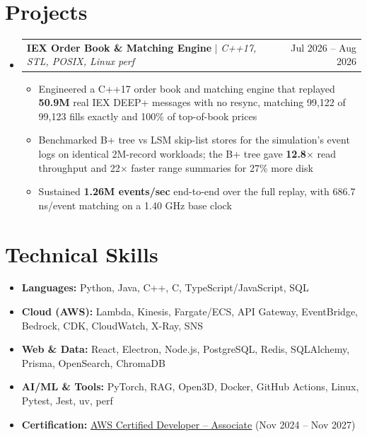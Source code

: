 \documentclass[letterpaper,10pt]{article}
\makeatletter
\newcommand{\resumeItem}[1]{\item{#1}\vspace{-1pt}}
\newcommand{\resumeProjectHeading}[2]{%
  \item
  \begin{tabular*}{\textwidth}{l@{\extracolsep{\fill}}r}
    #1 & #2 \\
  \end{tabular*}\vspace{-6pt}%
}
\newcommand{\resumeSubHeadingListStart}{\begin{itemize}[leftmargin=0in, label={}, itemsep=0pt, topsep=2pt]}
\newcommand{\resumeSubHeadingListEnd}{\end{itemize}}
\newcommand{\resumeItemListStart}{\begin{itemize}[leftmargin=0.18in, itemsep=0pt, topsep=1pt, parsep=0pt]}
\newcommand{\resumeItemListEnd}{\end{itemize}\vspace{0pt}}
\makeatother
\begin{document}
\section{Projects}
\resumeSubHeadingListStart
  \resumeProjectHeading
    {\textbf{IEX Order Book \& Matching Engine} $|$ \textit{C++17, STL, POSIX, Linux perf}}{Jul 2026 -- Aug 2026}
  \resumeItemListStart
    \resumeItem{Engineered a C++17 order book and matching engine that replayed \textbf{50.9M} real IEX DEEP+ messages with no resync, matching 99,122 of 99,123 fills exactly and 100\% of top-of-book prices}
    \resumeItem{Benchmarked B+ tree vs LSM skip-list stores for the simulation's event logs on identical 2M-record workloads; the B+ tree gave \textbf{12.8$\times$} read throughput and 22$\times$ faster range summaries for 27\% more disk}
    \resumeItem{Sustained \textbf{1.26M events/sec} end-to-end over the full replay, with 686.7 ns/event matching on a 1.40 GHz base clock}
  \resumeItemListEnd
\resumeSubHeadingListEnd

\section{Technical Skills}
\begin{itemize}[leftmargin=0in, label={}, itemsep=0pt, topsep=2pt]
  \small
  \item{\textbf{Languages:} Python, Java, C++, C, TypeScript/JavaScript, SQL}
  \item{\textbf{Cloud (AWS):} Lambda, Kinesis, Fargate/ECS, API Gateway, EventBridge, Bedrock, CDK, CloudWatch, X-Ray, SNS}
  \item{\textbf{Web \& Data:} React, Electron, Node.js, PostgreSQL, Redis, SQLAlchemy, Prisma, OpenSearch, ChromaDB}
  \item{\textbf{AI/ML \& Tools:} PyTorch, RAG, Open3D, Docker, GitHub Actions, Linux, Pytest, Jest, uv, perf}
  \item{\textbf{Certification:} \href{https://www.credly.com/badges/d2406a97-d937-47de-823b-724981159d3b/public_url}{\underline{AWS Certified Developer -- Associate}} (Nov 2024 -- Nov 2027)}
\end{itemize}
\end{document}
